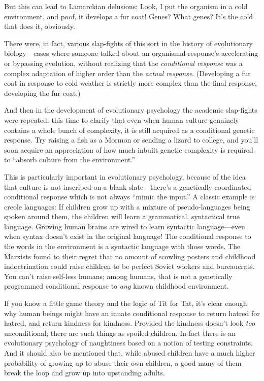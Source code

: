 {
 But this can lead to Lamarckian delusions: Look, I put the
organism in a cold environment, and poof, it develops a fur coat!
Genes? What genes? It's the cold that does it,
obviously.}

{
 There were, in fact, various slap-fights of this sort in the
history of evolutionary biology---cases where someone talked about an
organismal response's accelerating or bypassing
evolution, without realizing that the \textit{conditional response} was
a complex adaptation of higher order than the \textit{actual response}.
(Developing a fur coat in response to cold weather is strictly more
complex than the final response, developing the fur coat.)}

{
 And then in the development of evolutionary psychology the
academic slap-fights were repeated: this time to clarify that even when
human culture genuinely contains a whole bunch of complexity, it is
still acquired as a conditional genetic response. Try raising a fish as
a Mormon or sending a lizard to college, and you'll
soon acquire an appreciation of how much inbuilt genetic complexity is
required to ``absorb culture from the
environment.''}

{
 This is particularly important in evolutionary psychology, because
of the idea that culture is not inscribed on a blank
slate---there's a genetically coordinated conditional
response which is not always ``mimic the
input.'' A classic example is creole languages: If
children grow up with a mixture of pseudo-languages being spoken around
them, the children will learn a grammatical, syntactical true language.
Growing human brains are wired to learn syntactic language---even when
syntax doesn't exist in the original language! The
conditional response to the words in the environment is a syntactic
language with those words. The Marxists found to their regret that no
amount of scowling posters and childhood indoctrination could raise
children to be perfect Soviet workers and bureaucrats. You
can't raise self-less humans; among humans, that is not
a genetically programmed conditional response to \textit{any} known
childhood environment.}

{
 If you know a little game theory and the logic of Tit for Tat,
it's clear enough why human beings might have an innate
conditional response to return hatred for hatred, and return kindness
for kindness. Provided the kindness doesn't look
\textit{too} unconditional; there are such things as spoiled children.
In fact there is an evolutionary psychology of naughtiness based on a
notion of testing constraints. And it should also be mentioned that,
while abused children have a much higher probability of growing up to
abuse their own children, a good many of them break the loop and grow
up into upstanding adults.}

